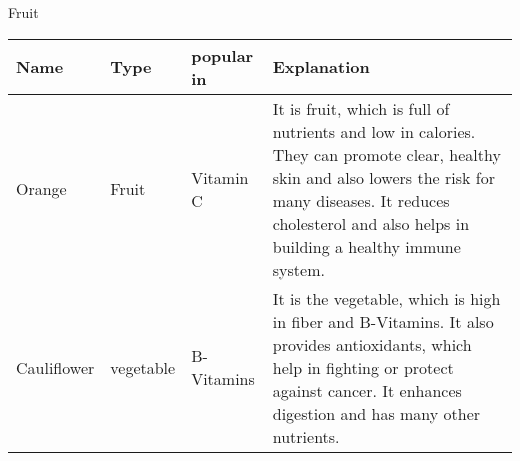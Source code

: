 \documentclass{article}
\begin{document}
  
  
             Fruit  
               \begin{center}  
               \begin{tabular}{ | l | l | l | p{5cm} |} %
               \hline  
                Name & Type & popular in & Explanation \\ \hline  
                Orange & Fruit & Vitamin C & It is fruit, which is full of nutrients and low in calories. They can promote clear, healthy skin and also lowers the risk for many diseases. It reduces cholesterol and also helps in building a healthy immune system.\\ \hline  
   
                Cauliflower & vegetable & B-Vitamins & It is the vegetable, which is high in fiber and B-Vitamins. It also provides antioxidants, which help in fighting or protect against cancer. It enhances digestion and has many other nutrients.\\ \hline  
   
                     \end{tabular}  
             \end{center}  
\end{document}
